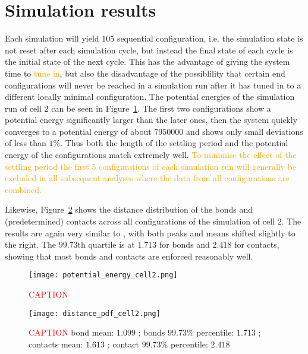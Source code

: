 
\section{Simulation results} %
\label{sec:simulation_results}

Each simulation will yield 105 sequential configuration, i.e. the simulation state is not reset after each simulation cycle, but instead the final state of each cycle is the initial state of the next cycle. This has the advantage of giving the system time to \textcolor{orange}{tune in}, but also the disadvantage of the possiblility that certain end configurations will never be reached in a simulation run after it has tuned in to a different locally minimal configuration. The potential energies of the simulation run of cell 2 can be seen in Figure~\ref{fig:potential_energy_cell2}. The first two configurations show a potential energy significantly larger than the later ones, then the system quickly converges to a potential energy of about \(\num{7950000}\) and shows only small deviations of less than \(1 \%\). Thus both the length of the settling period and the potential energy of the configurations match \cite{wettermann_minimal_2020} extremely well. \textcolor{orange}{To minimise the effect of the settling period the first 5 configurations of each simulation run will generally be excluded in all subsequent analyses where the data from all configurations are combined.}

Likewise, Figure~\ref{fig:distance_pdf_cell2} shows the distance distribution of the bonds and (predetermined) contacts across all configurations of the simulation of cell 2. The results are again very similar to \cite{wettermann_minimal_2020}, with both peaks and means shifted slightly to the right. The \(99.73\)th quartile is at \(1.713\) for bonds and \(2.418\) for contacts, showing that most bonds and contacts are enforced reasonably well.

\begin{figure}[ht]
\centering
  \texttt{[image: potential\_energy\_cell2.png]}
  \caption{\textcolor{red}{CAPTION}}
  \label{fig:potential_energy_cell2}
\end{figure}

\begin{figure}[ht]
\centering
  \texttt{[image: distance\_pdf\_cell2.png]}
  \caption{\textcolor{red}{CAPTION} bond mean: \(\num{1.099}\) ; bonds \(99.73\%\) percentile: \(1.713\) ; contacts mean: \(\num{1.613}\) ; contact \(99.73\%\) percentile: \(2.418\)}
  \label{fig:distance_pdf_cell2}
\end{figure}

